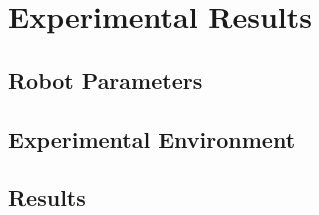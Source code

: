 \documentclass[journal]{IEEEtran}
\newcounter{row}
\newcounter{col}
\begin{document}
\section{Experimental Results}
\subsection{Robot Parameters}
\subsection{Experimental Environment}
\subsection{Results}


%


\end{document}
